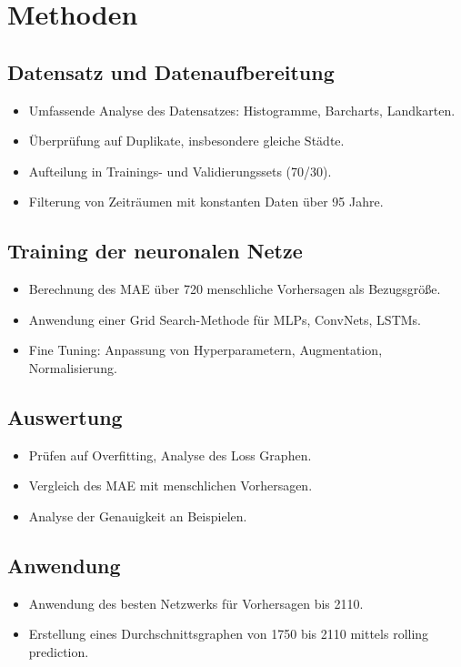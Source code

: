 \documentclass[acmtog, authorversion]{acmart} %
\begin{document}
\section{Methoden}

\subsection*{Datensatz und Datenaufbereitung}
\begin{itemize}
    \item Umfassende Analyse des Datensatzes: Histogramme, Barcharts, Landkarten.
    \item Überprüfung auf Duplikate, insbesondere gleiche Städte.
    \item Aufteilung in Trainings- und Validierungssets (70/30).
    \item Filterung von Zeiträumen mit konstanten Daten über 95 Jahre.
\end{itemize}

\subsection*{Training der neuronalen Netze}
\begin{itemize}
    \item Berechnung des MAE über 720 menschliche Vorhersagen als Bezugsgröße.
    \item Anwendung einer Grid Search-Methode für MLPs, ConvNets, LSTMs.
    \item Fine Tuning: Anpassung von Hyperparametern, Augmentation, Normalisierung.
\end{itemize}

\subsection*{Auswertung}
\begin{itemize}
    \item Prüfen auf Overfitting, Analyse des Loss Graphen.
    \item Vergleich des MAE mit menschlichen Vorhersagen.
    \item Analyse der Genauigkeit an Beispielen.
\end{itemize}

\subsection*{Anwendung}
\begin{itemize}
    \item Anwendung des besten Netzwerks für Vorhersagen bis 2110.
    \item Erstellung eines Durchschnittsgraphen von 1750 bis 2110 mittels rolling prediction.
\end{itemize}
\end{document}
